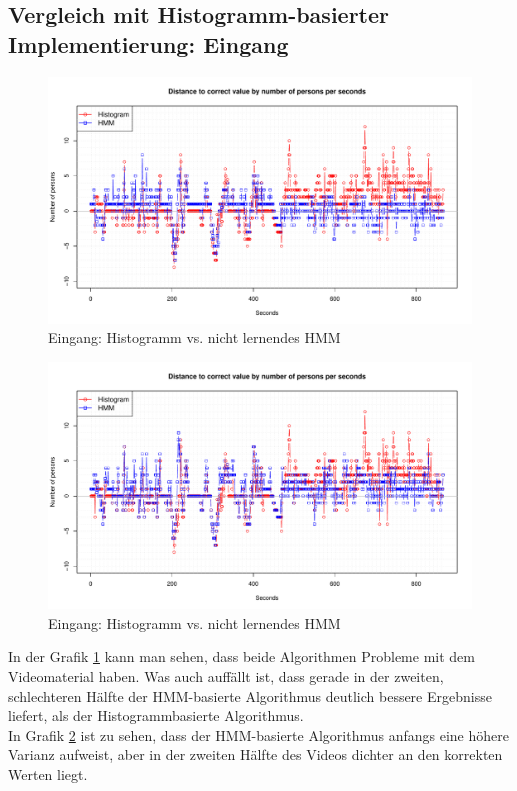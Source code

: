 \subsection{Vergleich mit Histogramm-basierter Implementierung: Eingang}
\label{sec:eval_eingang}
\begin{figure}
	\centering
\includegraphics[width=1\textwidth]{bilder/safest_plot_eingang2_nolearn.pdf}
	\caption{Eingang: Histogramm vs. nicht lernendes HMM}
	\label{fig:Eingang-nolearn}
\end{figure}
\begin{figure}
	\centering
\includegraphics[width=1\textwidth]{bilder/safest_plot_eingang2_learn.pdf}
	\caption{Eingang: Histogramm vs. nicht lernendes HMM}
	\label{fig:Eingang-learn}
\end{figure}
In der Grafik \ref{fig:Eingang-nolearn} kann man sehen, dass beide Algorithmen Probleme mit dem Videomaterial haben. Was auch auffällt ist, dass gerade in der zweiten, schlechteren Hälfte der HMM-basierte Algorithmus deutlich bessere Ergebnisse liefert, als der Histogrammbasierte Algorithmus.\\
In Grafik \ref{fig:Eingang-learn} ist zu sehen, dass der HMM-basierte Algorithmus anfangs eine höhere Varianz aufweist, aber in der zweiten Hälfte des Videos dichter an den korrekten Werten liegt.


